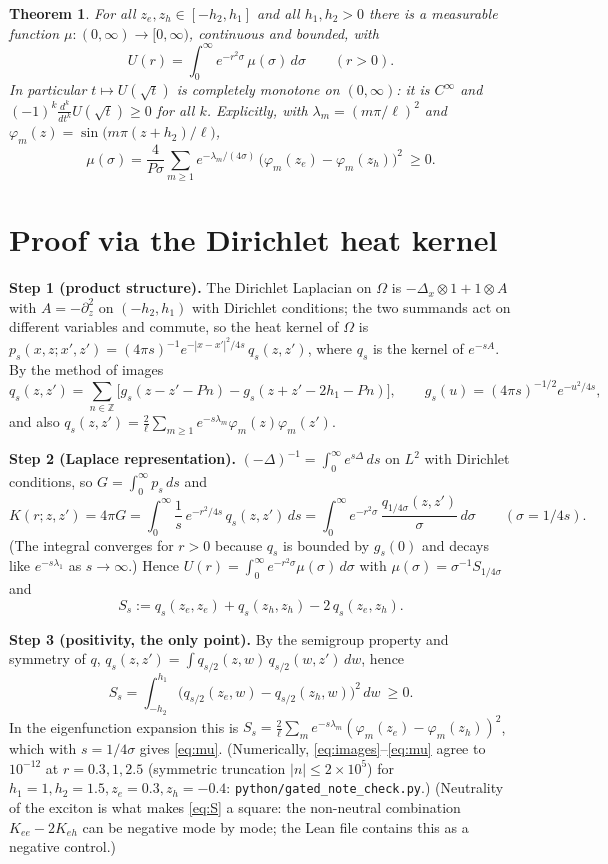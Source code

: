 \documentclass[11pt,a4paper]{article}
\newtheorem{theorem}{Theorem}
\theoremstyle{remark}
\newcommand{\Z}{\mathbb{Z}}
\begin{document}
\begin{theorem}\label{thm:main}
For all $z_e,z_h\in[-h_2,h_1]$ and all $h_1,h_2>0$ there is a measurable function $\mu:(0,\infty)\to[0,\infty)$, continuous and bounded, with
\[
U(r)=\int_0^\infty e^{-r^2\sigma}\,\mu(\sigma)\,d\sigma\qquad(r>0).
\]
In particular $t\mapsto U(\sqrt t)$ is completely monotone on $(0,\infty)$: it is $C^\infty$ and $(-1)^k\frac{d^k}{dt^k}U(\sqrt t)\ge0$ for all $k$.
Explicitly, with $\lambda_m=(m\pi/\ell)^2$ and $\varphi_m(z)=\sin\!\big(m\pi(z+h_2)/\ell\big)$,
\begin{equation}\label{eq:mu}
\mu(\sigma)=\frac{4}{P\sigma}\sum_{m\ge1}e^{-\lambda_m/(4\sigma)}\,\big(\varphi_m(z_e)-\varphi_m(z_h)\big)^2\ \ge0 .
\end{equation}
\end{theorem}

\section{Proof via the Dirichlet heat kernel}

\textbf{Step 1 (product structure).} The Dirichlet Laplacian on $\Omega$ is $-\Delta_x\otimes1+1\otimes A$ with $A=-\partial_z^2$ on
$(-h_2,h_1)$ with Dirichlet conditions; the two summands act on different variables and commute, so the heat kernel of $\Omega$ is
$p_s(x,z;x',z')=(4\pi s)^{-1}e^{-|x-x'|^2/4s}\,q_s(z,z')$, where $q_s$ is the kernel of $e^{-sA}$. By the method of images
\[
q_s(z,z')=\sum_{n\in\Z}\big[g_s(z-z'-Pn)-g_s(z+z'-2h_1-Pn)\big],\qquad g_s(u)=(4\pi s)^{-1/2}e^{-u^2/4s},
\]
and also $q_s(z,z')=\frac{2}{\ell}\sum_{m\ge1}e^{-s\lambda_m}\varphi_m(z)\varphi_m(z')$.

\textbf{Step 2 (Laplace representation).} $(-\Delta)^{-1}=\int_0^\infty e^{s\Delta}\,ds$ on $L^2$ with Dirichlet conditions, so
$G=\int_0^\infty p_s\,ds$ and
\[
K(r;z,z')=4\pi G=\int_0^\infty \frac1s\,e^{-r^2/4s}\,q_s(z,z')\,ds=\int_0^\infty e^{-r^2\sigma}\,\frac{q_{1/4\sigma}(z,z')}{\sigma}\,d\sigma
\qquad(\sigma=1/4s).
\]
(The integral converges for $r>0$ because $q_s$ is bounded by $g_s(0)$ and decays like $e^{-s\lambda_1}$ as $s\to\infty$.)
Hence $U(r)=\int_0^\infty e^{-r^2\sigma}\mu(\sigma)\,d\sigma$ with $\mu(\sigma)=\sigma^{-1}S_{1/4\sigma}$ and
\begin{equation}\label{eq:S}
S_s:=q_s(z_e,z_e)+q_s(z_h,z_h)-2\,q_s(z_e,z_h).
\end{equation}

\textbf{Step 3 (positivity, the only point).} By the semigroup property and symmetry of $q$,
$q_s(z,z')=\int q_{s/2}(z,w)\,q_{s/2}(w,z')\,dw$, hence
\[
S_s=\int_{-h_2}^{h_1}\big(q_{s/2}(z_e,w)-q_{s/2}(z_h,w)\big)^2\,dw\ \ge0 .
\]
In the eigenfunction expansion this is $S_s=\frac2\ell\sum_me^{-s\lambda_m}(\varphi_m(z_e)-\varphi_m(z_h))^2$, which with
$s=1/4\sigma$ gives \eqref{eq:mu}. (Numerically, \eqref{eq:images}--\eqref{eq:mu} agree to $10^{-12}$ at $r=0.3,1,2.5$ (symmetric truncation $|n|\le2\times10^5$) for $h_1=1,h_2=1.5,z_e=0.3,z_h=-0.4$: \texttt{python/gated\_note\_check.py}.) (Neutrality of the exciton is what makes \eqref{eq:S} a square: the non-neutral combination
$K_{ee}-2K_{eh}$ can be negative mode by mode; the Lean file contains this as a negative control.)
\end{document}
